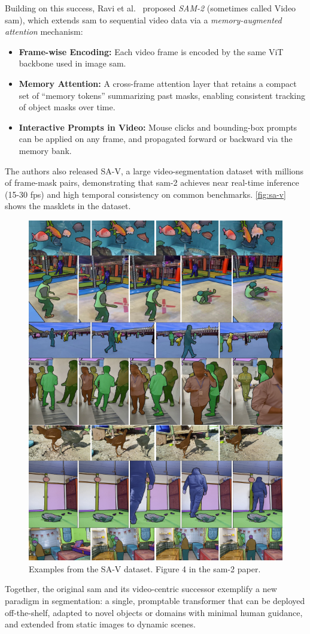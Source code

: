 Building on this success, Ravi et al.\ \cite{ravi_sam_nodate} proposed \emph{SAM-2} (sometimes called Video \acrshort{sam}), which extends \acrshort{sam} to sequential video data via a \emph{memory-augmented attention} mechanism:
\begin{itemize}
    \item \textbf{Frame-wise Encoding:} Each video frame is encoded by the same ViT backbone used in image \acrshort{sam}.
    \item \textbf{Memory Attention:} A cross-frame attention layer that retains a compact set of “memory tokens” summarizing past masks, enabling consistent tracking of object masks over time.
    \item \textbf{Interactive Prompts in Video:} Mouse clicks and bounding-box prompts can be applied on any frame, and propagated forward or backward via the memory bank.
\end{itemize}
The authors also released SA-V, a large video-segmentation dataset with millions of frame-mask pairs, demonstrating that \acrshort{sam}-2 achieves near real-time inference (15-30 fps) and high temporal consistency on common benchmarks. \autoref{fig:sa-v} shows the masklets in the dataset. 
\begin{figure}
    \centering
    \includegraphics[width=0.5\linewidth]{figures/sam_2.png}
    \caption{Examples from the SA-V dataset. Figure 4 in the \acrshort{sam}-2 paper\cite{ravi_sam_nodate}.}
    \label{fig:sa-v}
\end{figure}

Together, the original \acrshort{sam} and its video-centric successor exemplify a new paradigm in segmentation: a single, promptable transformer that can be deployed off-the-shelf, adapted to novel objects or domains with minimal human guidance, and extended from static images to dynamic scenes. 

